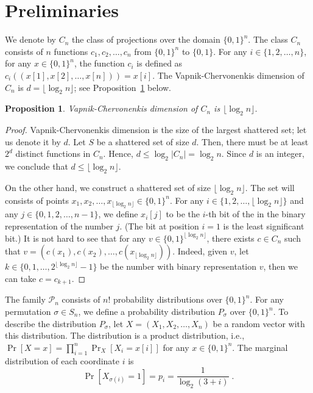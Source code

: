 \documentclass[10pt]{article}
\newtheorem{proposition}{Proposition}
\renewcommand{\P}{\mathcal{P}}
\begin{document}
\section{Preliminaries}

We denote by $C_n$ the class of projections over the domain $\{0,1\}^n$. The
class $C_n$ consists of $n$ functions $c_1, c_2, \dots, c_n$ from $\{0,1\}^n$ to
$\{0,1\}$. For any $i \in \{1,2,\dots,n\}$, for any $x \in \{0,1\}^n$,
the function $c_i$ is defined as $c_i((x[1], x[2], \dots, x[n])) = x[i]$.
The Vapnik-Chervonenkis dimension of $C_n$ is $d = \lfloor \log_2 n \rfloor$; see
Proposition~\ref{proposition:vc-dimension-projections} below.

\begin{proposition}
\label{proposition:vc-dimension-projections}
Vapnik-Chervonenkis dimension of $C_n$ is $\lfloor \log_2 n \rfloor$.
\end{proposition}

\begin{proof}
Vapnik-Chervonenkis dimension is the size of the largest shattered set; let us
denote it by $d$. Let $S$ be a shattered set of size $d$. Then, there must be at
least $2^d$ distinct functions in $C_n$. Hence, $d \le \log_2 |C_n| =
\log_2 n$. Since $d$ is an integer, we conclude that $d \le \lfloor \log_2 n
\rfloor$.

On the other hand, we construct a shattered set of size $\lfloor \log_2 n
\rfloor$. The set will consists of points $x_1, x_2, \dots, x_{\lfloor \log_2 n
\rfloor} \in \{0,1\}^n$. For any $i \in \{1,2,\dots,\lfloor \log_2 n \rfloor\}$
and any $j \in \{0,1,2,\dots,n-1\}$, we define $x_i[j]$ to be the $i$-th bit of the
in the binary representation of the number $j$. (The bit at position $i=1$ is the
least significant bit.) It is not hard to see that for any $v \in
\{0,1\}^{\lfloor \log_2 n \rfloor}$, there exists $c \in C_n$ such that $v =
(c(x_1), c(x_2), \dots, c(x_{\lfloor \log_2 n \rfloor}))$. Indeed, given $v$,
let $k \in \{0,1,\dots,2^{\lfloor \log_2 n \rfloor} - 1\}$ be the number with
binary representation $v$, then we can take $c = c_{k+1}$.
\end{proof}

The family $\P_n$ consists of $n!$ probability distributions over
$\{0,1\}^n$. For any permutation $\sigma \in S_n$, we define a probability distribution
$P_{\sigma}$ over $\{0,1\}^n$. To describe the distribution $P_\sigma$, let $X = (X_1,
X_2, \dots, X_n)$ be a random vector with this distribution.
The distribution is a product distribution, i.e., $\Pr[X = x] = \prod_{i=1}^n \Pr_{X}[X_i = x[i]]$
for any $x \in \{0,1\}^n$. The marginal
distribution of each coordinate $i$ is
$$
\Pr[X_{\sigma(i)} = 1] = p_i = \frac{1}{\log_2(3 + i)} \; .
$$
\end{document}
